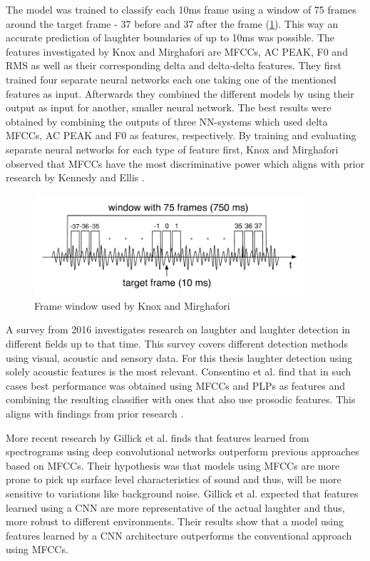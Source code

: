 \documentclass[bsc,frontabs,parskip,deptreport]{infthesis}
\begin{document}
The model was trained to classify each 10ms frame using a window of 75 frames around the target frame - 37 before and 37 after the frame (\ref{fig:know_window}).
This way an accurate prediction of laughter boundaries of up to 10ms was possible. 
The features investigated by Knox and Mirghafori are MFCCs, AC PEAK, F0 and RMS as well as their corresponding delta and delta-delta features.
They first trained four separate neural networks each one taking one of the mentioned features as input.
Afterwards they combined the different models by using their output as input for another, smaller neural network.
The best results were obtained by combining the outputs of three NN-systems which used delta MFCCs, AC PEAK and F0 as features, respectively.
By training and evaluating separate neural networks for each type of feature first, Knox and Mirghafori observed that MFCCs have the most discriminative power which aligns with prior research by Kennedy and Ellis \citep{kennedy2004laughter}.

\begin{figure}[htp]
    \centering
    \includegraphics[width=10cm]{imgs/Knox_window.png}
    \caption{Frame window used by Knox and Mirghafori}
    \label{fig:know_window}
\end{figure}

A survey from 2016 \citep{cosentino2016quantitative} investigates research on laughter and laughter detection in different fields up to that time.
This survey covers different detection methods using visual, acoustic and sensory data.
For this thesis laughter detection using solely acoustic features is the most relevant. Consentino et al. \citep{cosentino2016quantitative} find that in such cases best performance was obtained using MFCCs and PLPs as features and combining the resulting classifier with ones that also use prosodic features.
This aligns with findings from prior research \citep{truong2007automatic, knox2006automatic}.

More recent research by Gillick et al. \citep{gillick2021robust} finds that features learned from spectrograms using deep convolutional networks outperform previous approaches based on MFCCs.
Their hypothesis was that models using MFCCs are more prone to pick up surface level characteristics of sound and thus, will be more sensitive to variations like background noise.
Gillick et al. expected that features learned using a CNN are more representative of the actual laughter and thus, more robust to different environments. 
Their results show that a model using features learned by a CNN architecture outperforms the conventional approach using MFCCs. 
\end{document}
